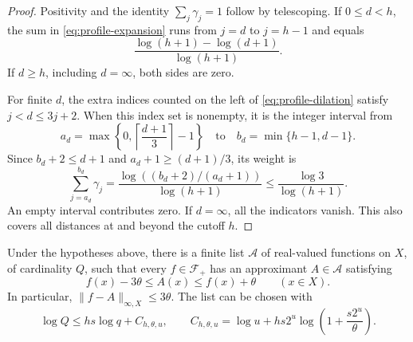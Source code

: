 \begin{proof}
Positivity and the identity $\sum_j\gamma_j=1$ follow by telescoping.
If $0\le d<h$, the sum in \eqref{eq:profile-expansion} runs from $j=d$
to $j=h-1$ and equals
\[
  \frac{\log(h+1)-\log(d+1)}{\log(h+1)}.
\]
If $d\ge h$, including $d=\infty$, both sides are zero.

For finite $d$, the extra indices counted on the left of
\eqref{eq:profile-dilation} satisfy $j<d\le3j+2$.  When this index set is
nonempty, it is the integer interval from
\[
  a_d=\max\left\{0,\left\lceil\frac{d+1}{3}\right\rceil-1\right\}
  \quad\text{to}\quad
  b_d=\min\{h-1,d-1\}.
\]
Since $b_d+2\le d+1$ and $a_d+1\ge(d+1)/3$, its weight is
\[
  \sum_{j=a_d}^{b_d}\gamma_j
  =\frac{\log((b_d+2)/(a_d+1))}{\log(h+1)}
  \le\frac{\log3}{\log(h+1)}.
\]
An empty interval contributes zero.  If $d=\infty$, all the indicators
vanish.  This also covers all distances at and beyond the cutoff $h$.
\end{proof}

\begin{proposition}
\label{prop:compression}
Under the hypotheses above, there is a finite list $\mathcal A$ of
real-valued functions on $X$, of cardinality $Q$, such that every
$f\in\mathcal F_+$ has an approximant $A\in\mathcal A$ satisfying
\begin{equation}
  f(x)-3\theta\le A(x)\le f(x)+\theta\qquad(x\in X).
  \label{eq:positive-approximation}
\end{equation}
In particular, $\|f-A\|_{\infty,X}\le3\theta$.  The list can be chosen with
\begin{equation}
  \log Q\le hs\log q+C_{h,\theta,u},
  \qquad
  C_{h,\theta,u}
   =\log u+hs2^u\log\left(1+\frac{s2^u}{\theta}\right).
  \label{eq:compression-count}
\end{equation}
\end{proposition}

